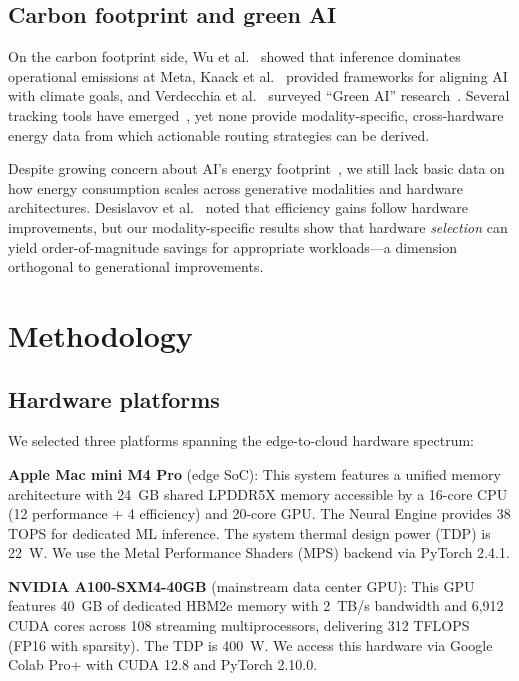 \documentclass[preprint,12pt]{elsarticle}
\begin{document}
\subsection{Carbon footprint and green AI}

On the carbon footprint side, Wu et al.~\cite{wu2022sustainable} showed that inference dominates operational emissions at Meta, Kaack et al.~\cite{kaack2022aligning} provided frameworks for aligning AI with climate goals, and Verdecchia et al.~\cite{verdecchia2023systematic} surveyed ``Green AI'' research~\cite{schwartz2020green}. Several tracking tools have emerged~\cite{henderson2020towards,lacoste2019quantifying,anthony2020carbontracker,garcia2019estimation}, yet none provide modality-specific, cross-hardware energy data from which actionable routing strategies can be derived.

Despite growing concern about AI's energy footprint~\cite{verdecchia2023systematic,wu2022sustainable,kaack2022aligning}, we still lack basic data on how energy consumption scales across generative modalities and hardware architectures. Desislavov et al.~\cite{desislavov2023trends} noted that efficiency gains follow hardware improvements, but our modality-specific results show that hardware \textit{selection} can yield order-of-magnitude savings for appropriate workloads---a dimension orthogonal to generational improvements.

\section{Methodology}
\label{sec:methodology}

\subsection{Hardware platforms}

We selected three platforms spanning the edge-to-cloud hardware spectrum:

\textbf{Apple Mac mini M4 Pro} (edge SoC): This system features a unified memory architecture with 24~GB shared LPDDR5X memory accessible by a 16-core CPU (12 performance + 4 efficiency) and 20-core GPU. The Neural Engine provides 38 TOPS for dedicated ML inference. The system thermal design power (TDP) is 22~W. We use the Metal Performance Shaders (MPS) backend via PyTorch 2.4.1.

\textbf{NVIDIA A100-SXM4-40GB} (mainstream data center GPU): This GPU features 40~GB of dedicated HBM2e memory with 2~TB/s bandwidth and 6,912 CUDA cores across 108 streaming multiprocessors, delivering 312 TFLOPS (FP16 with sparsity). The TDP is 400~W. We access this hardware via Google Colab Pro+ with CUDA 12.8 and PyTorch 2.10.0.
\end{document}
